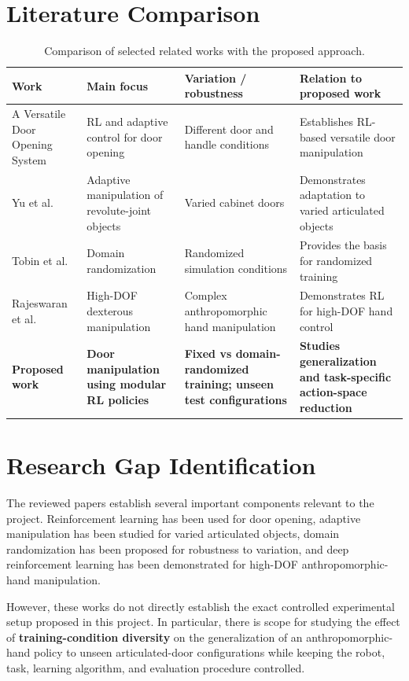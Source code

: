 \documentclass[12pt,a4paper]{report}
\begin{document}
\section{Literature Comparison}

\begin{table}[h!]
\centering
\small
\begin{tabular}{p{3.3cm} p{3.4cm} p{3.4cm} p{3.6cm}}
\toprule
\textbf{Work} & \textbf{Main focus} & \textbf{Variation / robustness} & \textbf{Relation to proposed work} \\
\midrule
A Versatile Door Opening System & RL and adaptive control for door opening & Different door and handle conditions & Establishes RL-based versatile door manipulation \\
\midrule
Yu et al. & Adaptive manipulation of revolute-joint objects & Varied cabinet doors & Demonstrates adaptation to varied articulated objects \\
\midrule
Tobin et al. & Domain randomization & Randomized simulation conditions & Provides the basis for randomized training \\
\midrule
Rajeswaran et al. & High-DOF dexterous manipulation & Complex anthropomorphic hand manipulation & Demonstrates RL for high-DOF hand control \\
\midrule
\textbf{Proposed work} & \textbf{Door manipulation using modular RL policies} & \textbf{Fixed vs domain-randomized training; unseen test configurations} & \textbf{Studies generalization and task-specific action-space reduction} \\
\bottomrule
\end{tabular}
\caption{Comparison of selected related works with the proposed approach.}
\end{table}

\section{Research Gap Identification}

The reviewed papers establish several important components relevant to the project. Reinforcement learning has been used for door opening, adaptive manipulation has been studied for varied articulated objects, domain randomization has been proposed for robustness to variation, and deep reinforcement learning has been demonstrated for high-DOF anthropomorphic-hand manipulation.

However, these works do not directly establish the exact controlled experimental setup proposed in this project. In particular, there is scope for studying the effect of \textbf{training-condition diversity} on the generalization of an anthropomorphic-hand policy to unseen articulated-door configurations while keeping the robot, task, learning algorithm, and evaluation procedure controlled.
\end{document}
